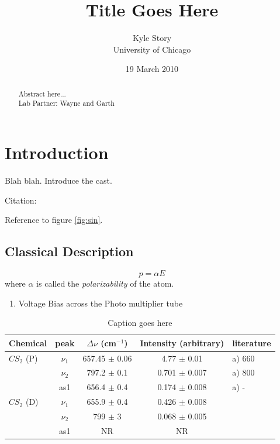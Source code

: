 \documentclass[12pt]{article}
\title{Title Goes Here}
\author{Kyle Story\\University of Chicago}
\date{19 March 2010}
\begin{document}
\maketitle

\begin{abstract}
  Abstract here...
  \\ Lab Partner: Wayne and Garth
\end{abstract}

\tableofcontents
\listoffigures
\newpage

\section{Introduction}
Blah blah.  Introduce the cast.

Citation: \cite{hu02a}

Reference to figure \ref{fig:sin}.

\subsection{Classical Description}

\begin{equation}
  p = \alpha E
\label{eqn:dipole_moment}
\end{equation}
where $\alpha$ is called the \textit{polarizability} of the atom.

\begin{enumerate}
  \item Voltage Bias across the Photo multiplier tube
\end{enumerate}

\begin{table}
  \caption{Caption goes here}
  \begin{center}
    \begin{tabular}{|| l | c | c | c | l ||}
      \hline
      Chemical & peak &  $\Delta \nu$ (cm$^{-1}$) & Intensity (arbitrary) & literature\\
      \hline\hline
      $CS_2$ (P)    & $\nu_1$  & 657.45 $\pm$ 0.06 & 4.77  $\pm$ 0.01  & a) 660 \\
                    & $\nu_2$  & 797.2  $\pm$ 0.1  & 0.701 $\pm$ 0.007 & a) 800 \\
                    & as1  & 656.4  $\pm$ 0.4  & 0.174 $\pm$ 0.008 & a) -  \\
      \hline
      $CS_2$ (D)    & $\nu_1$  & 655.9  $\pm$ 0.4  & 0.426 $\pm$ 0.008 & \\
                    & $\nu_2$  & 799    $\pm$ 3    & 0.068 $\pm$ 0.005 & \\
                    & as1  & NR & NR & \\
      \hline
    \end{tabular}
  \end{center}
  \label{tab:data1}
\end{table}
\end{document}
